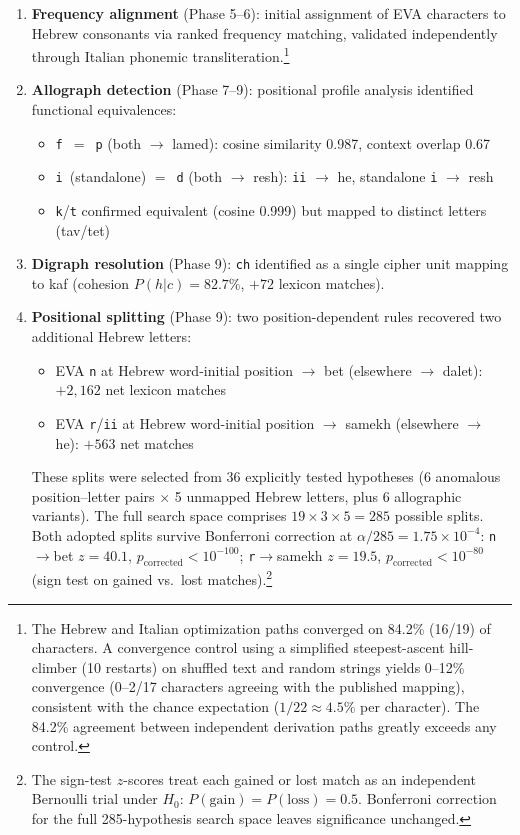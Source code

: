 \documentclass[11pt,a4paper]{article}
\newcommand{\eva}[1]{\texttt{#1}}
\begin{document}
\begin{enumerate}
\item \textbf{Frequency alignment} (Phase 5--6): initial assignment of EVA
characters to Hebrew consonants via ranked frequency matching, validated
independently through Italian phonemic transliteration.\footnote{The
  Hebrew and Italian optimization paths converged on 84.2\% (16/19)
  of characters.  A convergence control using a simplified steepest-ascent
  hill-climber (10 restarts) on shuffled text and random strings yields
  0--12\% convergence (0--2/17 characters agreeing with the published
  mapping), consistent with the chance expectation ($1/22 \approx 4.5\%$
  per character). The 84.2\% agreement between independent derivation
  paths greatly exceeds any control.}

\item \textbf{Allograph detection} (Phase 7--9): positional profile analysis
identified functional equivalences:
  \begin{itemize}
  \item \eva{f}~$=$~\eva{p} (both $\to$ lamed): cosine similarity 0.987,
    context overlap 0.67
  \item \eva{i}~(standalone) $=$~\eva{d} (both $\to$ resh): \eva{ii}
    $\to$ he, standalone \eva{i} $\to$ resh
  \item \eva{k}/\eva{t} confirmed equivalent (cosine 0.999) but mapped to
    distinct letters (tav/tet)
  \end{itemize}

\item \textbf{Digraph resolution} (Phase 9): \eva{ch} identified as a
single cipher unit mapping to kaf (cohesion $P(h|c)=82.7\%$, $+72$ lexicon
matches).

\item \textbf{Positional splitting} (Phase 9): two position-dependent rules
recovered two additional Hebrew letters:
  \begin{itemize}
  \item EVA \eva{n} at Hebrew word-initial position $\to$ bet
    (elsewhere $\to$ dalet): $+2{,}162$ net lexicon matches
  \item EVA \eva{r}/\eva{ii} at Hebrew word-initial position $\to$ samekh
    (elsewhere $\to$ he): $+563$ net matches
  \end{itemize}
These splits were selected from 36 explicitly tested hypotheses (6
anomalous position--letter pairs $\times$ 5 unmapped Hebrew letters,
plus 6 allographic variants). The full search space comprises
$19 \times 3 \times 5 = 285$ possible splits. Both adopted splits
survive Bonferroni correction at $\alpha/285 = 1.75 \times 10^{-4}$:
\eva{n}$\to$bet $z = 40.1$, $p_{\mathrm{corrected}} < 10^{-100}$;
\eva{r}$\to$samekh $z = 19.5$, $p_{\mathrm{corrected}} < 10^{-80}$
(sign test on gained vs.\ lost matches).\footnote{The
  sign-test $z$-scores treat each gained or lost match as an
  independent Bernoulli trial under $H_0$: $P(\text{gain}) =
  P(\text{loss}) = 0.5$.  Bonferroni correction for the full
  285-hypothesis search space leaves significance unchanged.}
\end{enumerate}
\end{document}
